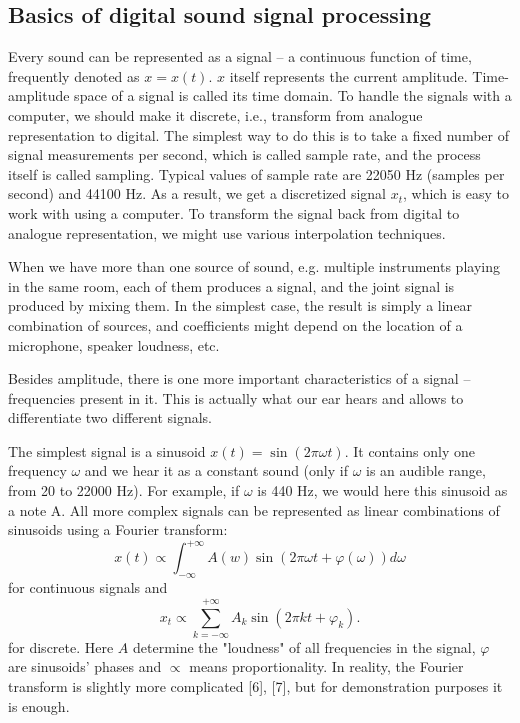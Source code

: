 \documentclass[../main.tex]{subfiles} %
\begin{document}
\subsection{Basics of digital sound signal processing}

Every sound can be represented as a signal -- a continuous function of time, frequently denoted as $x = x(t)$. $x$ itself represents the current amplitude. Time-amplitude space of a signal is called its time domain.
To handle the signals with a computer, we should make it discrete, i.e., transform from analogue representation to digital. The simplest way to do this is to take a fixed number of signal measurements per second, which is called sample rate, and the process itself is called sampling. 
Typical values of sample rate are 22050 Hz (samples per second) and 44100 Hz. 
As a result, we get a discretized signal $x_t$, which is easy to work with using a computer. 
To transform the signal back from digital to analogue representation, we might use various interpolation techniques.

When we have more than one source of sound, e.g. multiple instruments playing in the same room, each of them produces a signal, and the joint signal is produced by mixing them. 
In the simplest case, the result is simply a linear combination of sources, and coefficients might depend on the location of a microphone, speaker loudness, etc.


Besides amplitude, there is one more important characteristics of a signal -- frequencies present in it. 
This is actually what our ear hears and allows to differentiate two different signals.

The simplest signal is a sinusoid $x(t) = \sin(2\pi \omega t)$. 
It contains only one frequency $\omega$ and we hear it as a constant sound (only if $\omega$ is an audible range, from 20 to 22000 Hz).
For example, if $\omega$ is 440 Hz, we would here this sinusoid as a note A.
All more complex signals can be represented as linear combinations of sinusoids using a Fourier transform: 
\[ x(t) \propto \int_{-\infty}^{+\infty} A(w) \sin(2\pi \omega t + \varphi(\omega)) d \omega \]
for continuous signals and 
\[ x_t \propto \sum_{k=-\infty}^{+\infty} A_k \sin(2 \pi k t + \varphi_k). \]
for discrete. 
Here $A$ determine the "loudness" of all frequencies in the signal, $\varphi$ are sinusoids' phases and $\propto$ means proportionality. 
In reality, the Fourier transform is slightly more complicated [6], [7], but for demonstration purposes it is enough.
\end{document}
